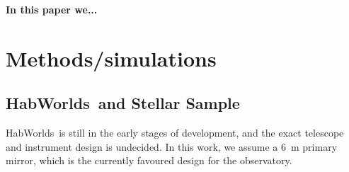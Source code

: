 \documentclass[
    usenatbib,
]{mnras}
\newcommand{\hwo}{HabWorlds}
\begin{document}
\textbf{In this paper we...}






 



\section{Methods/simulations}
\subsection{\hwo\ and Stellar Sample}
\hwo\ is still in the early stages of development, and the exact telescope and instrument design is undecided. 
In this work, we assume a \SI{6}{\meter} primary mirror, which is the currently favoured design for the observatory.
\end{document}
